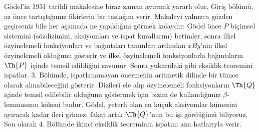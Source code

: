 



G\"odel'in 1931 tarihli makalesine biraz zaman ayırmak yararlı olur. Giriş
bölümü, az önce tartıştığımız fikirlerin bir taslağını verir. Makaleyi yalnızca
gözden geçirseniz bile her aşamada ne yapıldığını görmek kolaydır: G\"odel
önce $P$ biçimsel sistemini (sözdizimini, aksiyomları ve ispat kurallarını)
betimler; sonra ilkel özyinelemeli fonksiyonları ve bağıntıları tanımlar;
ardından $x B y$'nin ilkel özyinelemeli olduğunu gösterir ve ilkel
özyinelemeli fonksiyonlarla bağıntıların $\Th{P}$ içinde temsil edildiğini
savunur. Sonra yukarıdaki gibi eksiklik teoremini ispatlar. 3. Bölümde,
ispatlanamayan önermenin aritmetik dilinde bir tümce olarak alınabileceğini
gösterir. Dizileri ele alıp özyinelemeli fonksiyonların $\Th{Q}$ içinde temsil
edilebilir olduğunu göstermek için bizim de kullandığımız $\beta$-lemmasının
kökeni budur. G\"odel, yeterli olan en küçük aksiyomlar kümesini ayıracak kadar
ileri gitmez; fakat artık $\Th{Q}$'nun bu işi gördüğünü biliyoruz. Son olarak
4. Bölümde ikinci eksiklik teoreminin ispatını ana hatlarıyla verir.

